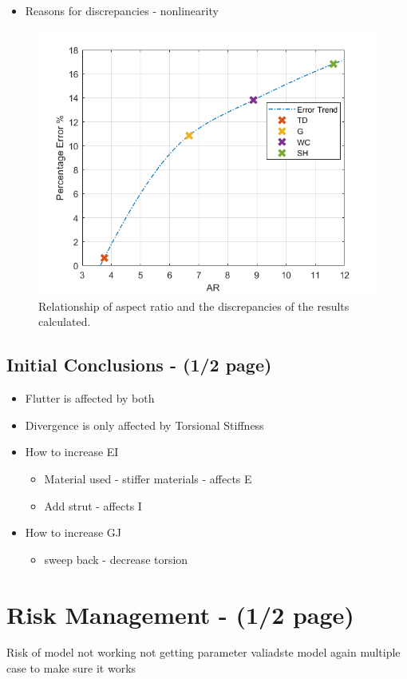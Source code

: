 \documentclass[11pt]{article}
\begin{document}
\begin{itemize}
    \item Reasons for discrepancies - nonlinearity
\end{itemize}

\begin{figure}[H]
    \centering
    \includegraphics[width = .7\textwidth]{figures/error-trend.png}
    \caption{Relationship of aspect ratio and the discrepancies of the results calculated.}
    \label{fig:error}
\end{figure}

\subsection{Initial Conclusions - (1/2 page)}
\begin{itemize}
    \item Flutter is affected by both
    \item Divergence is only affected by Torsional Stiffness
    \item How to increase EI
    \begin{itemize}
        \item Material used - stiffer materials - affects E
        \item Add strut - affects I
    \end{itemize}
    \item How to increase GJ
    \begin{itemize}
        \item sweep back - decrease torsion
    \end{itemize}
\end{itemize}

\section{Risk Management - (1/2 page)}
Risk of model not working
not getting parameter
valiadste model again multiple case to make sure it works
\end{document}
